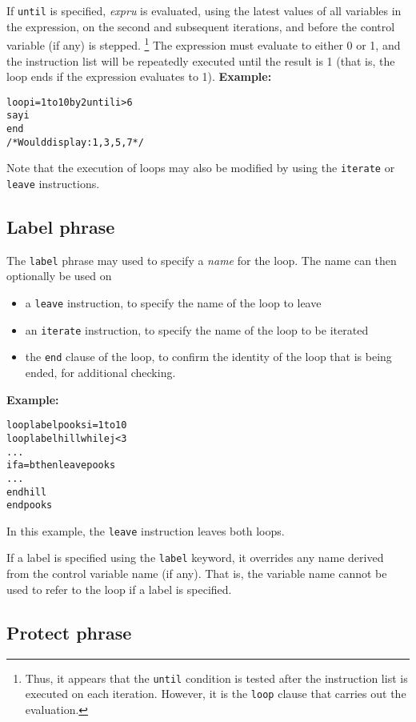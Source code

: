 \begin{description}
If \texttt{until} is specified, \emph{expru} is evaluated, using the
latest values of all variables in the expression, on the second and
subsequent iterations, and before the control variable (if any) is stepped.
\footnote{
Thus, it appears that the \texttt{until} condition is tested after the
instruction list is executed on each iteration.
However, it is the \texttt{loop} clause that carries out the evaluation.
}
The expression must evaluate to either 0 or 1, and the instruction list
will be repeatedly executed until the result is 1 (that is, the loop
ends if the expression evaluates to 1).
 \textbf{Example:}
\begin{alltt}
loop i=1 to 10 by 2 until i>6
  say i
  end
/* Would display: 1, 3, 5, 7 */
\end{alltt}
\end{description}
 Note that the execution of loops may also be modified by
using the \texttt{iterate} or \texttt{leave} instructions.
\subsection{Label phrase}
 
The \texttt{label} phrase may used to specify a \emph{name} for the
loop.  The name can then optionally be used on
\begin{itemize}
\item a \texttt{leave} instruction, to specify the name of the loop to leave
\item an \texttt{iterate} instruction, to specify the name of the loop to
be iterated
\item the \texttt{end} clause of the loop, to confirm the identity of the
loop that is being ended, for additional checking.
\end{itemize}
 \textbf{Example:}
\begin{alltt}
loop label pooks i=1 to 10
  loop label hill while j<3
    ...
    if a=b then leave pooks
    ...
    end hill
  end pooks
\end{alltt}
In this example, the \texttt{leave} instruction leaves both loops.
 
If a label is specified using the \texttt{label} keyword, it overrides
any name derived from the control variable name (if any).  That is, the
variable name cannot be used to refer to the loop if a label is
specified.
\subsection{Protect phrase}
 

